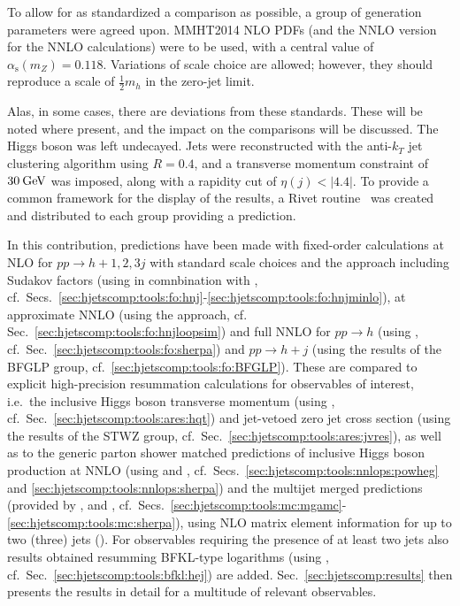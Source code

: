 To allow for as standardized a comparison as possible, a group of
generation parameters were agreed upon. MMHT2014 NLO PDFs (and the
NNLO version for the NNLO calculations) were to be used, with a
central value of $\alpha_\mathrm{s}(m_Z)=0.118$.  
Variations of scale choice are allowed; however, they
should reproduce a scale of $\tfrac{1}{2}m_h$ in the zero-jet limit.

Alas, in some cases, there are deviations from these standards. These
will be noted where present, and the impact on the comparisons will be
discussed.  The Higgs boson was left undecayed. Jets were reconstructed 
with the anti-$k_T$ jet clustering algorithm \cite{Cacciari:2008gp} using
$R=0.4$, and a transverse momentum constraint of $30\text{\:GeV}$ was imposed,
along with a rapidity cut of $\eta(j)<|4.4|$.  To provide a common
framework for the display of the results, a Rivet
routine~\cite{Buckley:2010ar,webpage} was created and distributed to each group
providing a prediction.

In this contribution, predictions have been made with fixed-order
calculations at NLO for $pp\to h+1,2,3j$ with standard scale choices 
and the \Minlo approach including Sudakov factors (using \GoSam in 
comnbination with \Sherpa, cf.\ Secs.\ 
\ref{sec:hjetscomp:tools:fo:hnj}-\ref{sec:hjetscomp:tools:fo:hnjminlo}), 
at approximate NNLO (using the \Loopsim approach, cf. Sec.\ 
\ref{sec:hjetscomp:tools:fo:hnjloopsim}) and full NNLO for $pp\to h$ 
(using \Sherpa, cf.\ Sec.\ \ref{sec:hjetscomp:tools:fo:sherpa}) and 
$pp\to h+j$ (using the results of the BFGLP group, cf.\ 
\ref{sec:hjetscomp:tools:fo:BFGLP}). These are compared to explicit 
high-precision resummation calculations for observables of interest, 
i.e.\ the inclusive Higgs boson transverse momentum (using \HqT, cf.\ 
Sec.\ \ref{sec:hjetscomp:tools:ares:hqt}) and jet-vetoed zero jet 
cross section (using the results of the STWZ group, cf.\ Sec.\ 
\ref{sec:hjetscomp:tools:ares:jvres}), as well as to the generic 
parton shower matched predictions of inclusive Higgs boson production 
at NNLO (using \Powheg and \Sherpa, cf.\ Secs.\ 
\ref{sec:hjetscomp:tools:nnlops:powheg} and 
\ref{sec:hjetscomp:tools:nnlops:sherpa}) and the multijet merged 
predictions (provided by \MGaMC, \Herwig and \Sherpa, cf.\ Secs.\ 
\ref{sec:hjetscomp:tools:mc:mgamc}-\ref{sec:hjetscomp:tools:mc:sherpa}), 
using NLO matrix element information for up to two (three) jets (\Sherpa). 
For observables requiring the presence of at least two jets also results 
obtained resumming BFKL-type logarithms (using \Hej, cf.\ Sec.\ 
\ref{sec:hjetscomp:tools:bfkl:hej}) are added. 
Sec.\ \ref{sec:hjetscomp:results} then presents the results in detail 
for a multitude of relevant observables.
